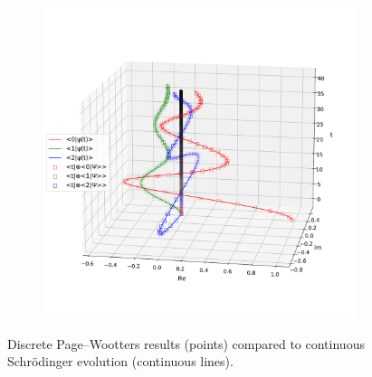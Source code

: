 \begin{figure}[p] %
  \begin{leftfullpage}
    \begin{subfigure}{\textwidth}
      \includegraphics[width=\textwidth]{img/3ldetect/PWSpaceTimeFit_side.pdf}
      \label{fig:3lev:PWSpaceTimeFit:side}
    \end{subfigure}
    \caption{
      Discrete Page--Wootters results (points)
      compared to continuous
      Schr\"{o}dinger
      evolution (continuous lines).
    }
    \label{fig:3lev:PWSpaceTimeFit}
  \end{leftfullpage}
\end{figure}

